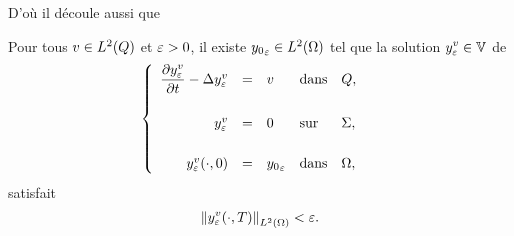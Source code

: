 D'où il découle aussi que

\begin{corollaire}\label{coro:controllability-result-3}%
    Pour tous $v\in L^{2}\!\left({Q}\right)$ et $\varepsilon > 0$, il existe ${y_{0}}_{\varepsilon}\in
    L^{2}\!\left({\Omega}\right)$ tel que la solution $\displaystyle
    y_{\varepsilon}^{v}\in \mathbb{V}$ de
    \begin{equation}\label{eq:controllability-result-5}
        \begin{cases}\displaystyle
            \begin{array}{rclll}
                \dfrac{\partial{}y_{\varepsilon}^{v}}{\partial{}t} - \Delta y_{\varepsilon}^{v} & = & v &
                \text{dans} & Q,\\
                \\
                y_{\varepsilon}^{v} & = & 0 & \text{sur} & \Sigma,\\
                \\
                y_{\varepsilon}^{v}\!\left({\cdot,0}\right) & = & {y_{0}}_{\varepsilon}
                & \text{dans} & \Omega,
            \end{array}
        \end{cases}
    \end{equation}
    satisfait
    \begin{equation*}\label{eq:controllability-result-6}
        {\left\|{y_{\varepsilon}^{v}\!\left({\cdot,T}\right) }\right\|}_{L^{2}\left({\Omega}\right)} < \varepsilon.
    \end{equation*}
\end{corollaire}

